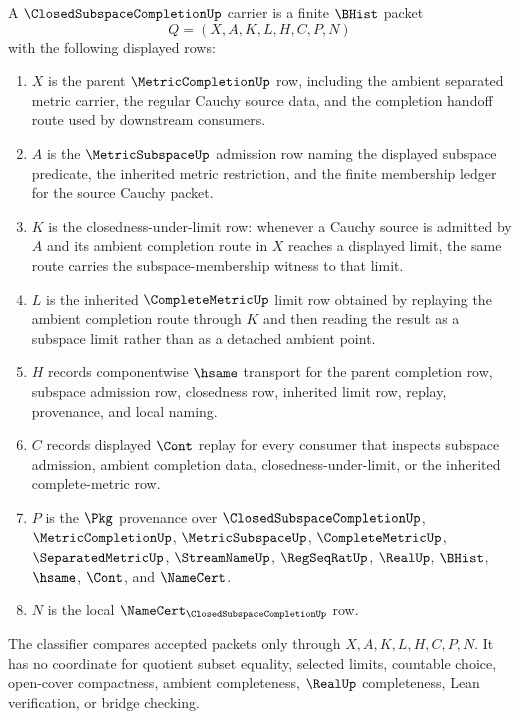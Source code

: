 \begin{definition}
\label{def:closed-subspace-completion-carrier}
A $\ClosedSubspaceCompletionUp$ carrier is a finite $\BHist$ packet
$$
Q=(X,A,K,L,H,C,P,N)
$$
with the following displayed rows:
\begin{enumerate}
\item $X$ is the parent $\MetricCompletionUp$ row, including the ambient separated metric carrier, the regular Cauchy source data, and the completion handoff route used by downstream consumers.
\item $A$ is the $\MetricSubspaceUp$ admission row naming the displayed subspace predicate, the inherited metric restriction, and the finite membership ledger for the source Cauchy packet.
\item $K$ is the closedness-under-limit row: whenever a Cauchy source is admitted by $A$ and its ambient completion route in $X$ reaches a displayed limit, the same route carries the subspace-membership witness to that limit.
\item $L$ is the inherited $\CompleteMetricUp$ limit row obtained by replaying the ambient completion route through $K$ and then reading the result as a subspace limit rather than as a detached ambient point.
\item $H$ records componentwise $\hsame$ transport for the parent completion row, subspace admission row, closedness row, inherited limit row, replay, provenance, and local naming.
\item $C$ records displayed $\Cont$ replay for every consumer that inspects subspace admission, ambient completion data, closedness-under-limit, or the inherited complete-metric row.
\item $P$ is the $\Pkg$ provenance over $\ClosedSubspaceCompletionUp$, $\MetricCompletionUp$, $\MetricSubspaceUp$, $\CompleteMetricUp$, $\SeparatedMetricUp$, $\StreamNameUp$, $\RegSeqRatUp$, $\RealUp$, $\BHist$, $\hsame$, $\Cont$, and $\NameCert$.
\item $N$ is the local $\NameCert_{\ClosedSubspaceCompletionUp}$ row.
\end{enumerate}
The classifier compares accepted packets only through $X,A,K,L,H,C,P,N$. It has no coordinate for quotient subset equality, selected limits, countable choice, open-cover compactness, ambient completeness, $\RealUp$ completeness, Lean verification, or bridge checking.
\end{definition}

